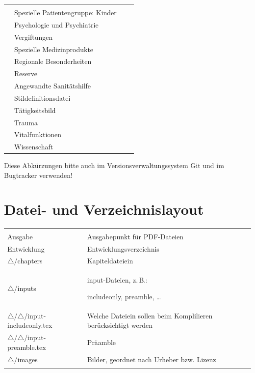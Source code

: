 \documentclass[
ngerman,
paper=a4,
asymmetric,
fontsize=10pt,
draft=false,
numbers=noenddot,
bibtotocnumbered,
footnotes=multiple,
toc=flat,
]{scrbook}
\begin{document}
\begin{tabulary}{\linewidth}{cLlL}
 & 
\\\addlinespace
{} & Spezielle Patientengruppe: Kinder & 
 & 
\\\addlinespace
{} & Psychologie und Psychiatrie & 
 & 
\\\addlinespace
{} & Vergiftungen & 
 & 
\\\addlinespace
{} & Spezielle Medizinprodukte & 
\caps{---} & 
\\\addlinespace
{} & Regionale Besonderheiten &  \caps{---} &
\\\addlinespace
{} & Reserve &  \caps{---} &
\\\addlinespace
{} & Angewandte Sanitätshilfe &   &
\\\addlinespace
{}  & Stildefinitionsdatei &  \caps{---} &
\\\addlinespace
{} & Tätigkeitsbild &  \caps{---} &
\\\addlinespace
{} & Trauma &   &
\\\addlinespace
{} & Vitalfunktionen &   &
\\\addlinespace
{} & Wissenschaft & 
\caps{---} & 
\\\bottomrule
\end{tabulary}

Diese Abkürzungen bitte auch im Versionsverwaltungssystem
Git und im Bugtracker verwenden!

\section{Datei- und Verzeichnislayout}



\begin{table}[H]
\begin{tabulary}{\linewidth}{lL}
\toprule\addlinespace
{}
\\\addlinespace\midrule\addlinespace 
Ausgabe & Ausgabepunkt
für PDF-Dateien \\\addlinespace
Entwicklung & Entwicklungsverzeichnis
\\\addlinespace
$\bigtriangleup$/chapters & Kapiteldateiein
\\
$\bigtriangleup$/inputs & input-Dateien, z.\,B.:

includeonly, preamble, \ldots
\\
$\bigtriangleup$/$\bigtriangleup$/input-includeonly.tex &
Welche Dateiein sollen beim Komplilieren berücksichtigt
werden
\\
$\bigtriangleup$/$\bigtriangleup$/input-preamble.tex &
Präamble
\\
$\bigtriangleup$/images & Bilder, geordnet nach Urheber bzw.
Lizenz
\\\addlinespace\bottomrule\addlinespace
\end{tabulary}
\end{table}
\end{document}
